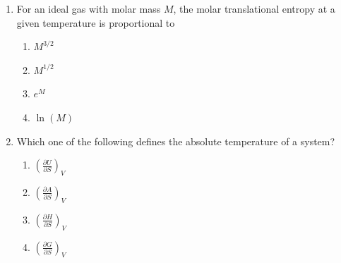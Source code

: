 \documentclass[journal,12pt,onecolumn]{exam}
\theoremstyle{remark}
\begin{document}
\begin{enumerate}
 



From the above Carnot cycle undergone by an ideal gas, identify the processes in which the change in internal energy is \textbf{NON-ZERO}.

\hfill{}

 

\begin{multicols}{2}
\begin{enumerate}
    \item \textcolor{red}{} I and II
    \item \textcolor{green}{\checkmark} II and IV
    \item \textcolor{red}{} II and III
    \item \textcolor{red}{} I and IV
\end{enumerate}
\end{multicols}

 

\item

For an ideal gas with molar mass $M$, the molar translational entropy at a given temperature is proportional to

\hfill{}

 

\begin{multicols}{2}
\begin{enumerate}
    \item \textcolor{red}{} $M^{3/2}$
    \item \textcolor{red}{} $M^{1/2}$
    \item \textcolor{red}{} $e^M$
    \item \textcolor{green}{\checkmark} $\ln(M)$
\end{enumerate}
\end{multicols}

 

\item

Which one of the following defines the absolute temperature of a system?

\hfill{}

 

\begin{multicols}{2}
\begin{enumerate}
    \item \textcolor{green}{\checkmark} $\left(\frac{\partial U}{\partial S}\right)_V$
    \item \textcolor{red}{} $\left(\frac{\partial A}{\partial S}\right)_V$
    \item \textcolor{red}{} $\left(\frac{\partial H}{\partial S}\right)_V$
    \item \textcolor{red}{} $\left(\frac{\partial G}{\partial S}\right)_V$
\end{enumerate}
\end{multicols}


\end{enumerate}
\end{document}
